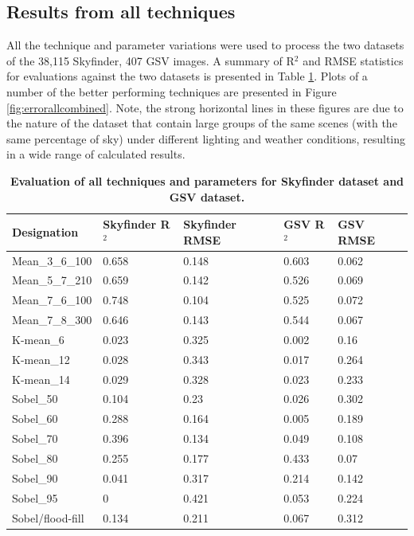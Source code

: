 \documentclass[final,3p,times,authoryear]{elsarticle}
\begin{document}
\subsection{Results from all techniques}\label{sec:resultsall}
All the technique and parameter variations were used to process the two datasets of the 38,115 Skyfinder, 407 GSV images. A summary of R$^{2}$ and RMSE statistics for evaluations against the two datasets is presented in Table \ref{tab:evalall}. Plots of a number of the better performing techniques are presented in Figure \ref{fig:errorallcombined}. Note, the strong horizontal lines in these figures are due to the nature of the dataset that contain large groups of the same scenes (with the same percentage of sky) under different lighting and weather conditions, resulting in a wide range of calculated results.

\begin{table}[!htbp]
\caption{\bf Evaluation of all techniques and parameters for Skyfinder dataset and GSV dataset. \label{tab:evalall}}     
\begin{tabular}{ l  l l l l }
\textbf{Designation}  & \textbf{Skyfinder R$^{2}$} & \textbf{Skyfinder RMSE} & \textbf{GSV R$^{2}$} & \textbf{GSV RMSE}  \\ \hline
Mean\_3\_6\_100	&0.658&0.148&0.603&0.062 \\
Mean\_5\_7\_210	&0.659&0.142&0.526&0.069 \\
Mean\_7\_6\_100	&0.748&0.104&0.525&0.072 \\
Mean\_7\_8\_300 &0.646&0.143&0.544&0.067  \\
K-mean\_6       &0.023&0.325&0.002&0.16 \\
K-mean\_12      &0.028&0.343&0.017&0.264 \\
K-mean\_14      &0.029&0.328&0.023&0.233 \\
Sobel\_50       &0.104&0.23 &0.026&0.302 \\
Sobel\_60       &0.288&0.164&0.005&0.189 \\
Sobel\_70       &0.396&0.134&0.049&0.108 \\
Sobel\_80       &0.255&0.177&0.433&0.07  \\
Sobel\_90       &0.041&0.317&0.214&0.142 \\
Sobel\_95       &0    &0.421&0.053&0.224 \\
\hline
Sobel/flood-fill&0.134&0.211&0.067&0.312 \\
\hline
\end{tabular}
\end{table}
\end{document}
